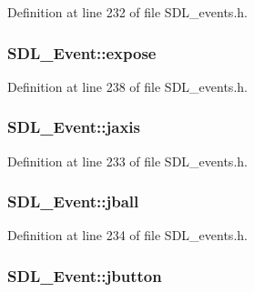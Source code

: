 Definition at line 232 of file S\+D\+L\+\_\+events.\+h.

\hypertarget{union_s_d_l___event_ae70b3cbeb6e05e3e1322a906c9fbe7d5}{}
\subsubsection[{expose}]{ S\+D\+L\+\_\+\+Event\+::expose}\label{union_s_d_l___event_ae70b3cbeb6e05e3e1322a906c9fbe7d5}


Definition at line 238 of file S\+D\+L\+\_\+events.\+h.

\hypertarget{union_s_d_l___event_ac4611acd0e9c675e67dc20919f0accb4}{}
\subsubsection[{jaxis}]{ S\+D\+L\+\_\+\+Event\+::jaxis}\label{union_s_d_l___event_ac4611acd0e9c675e67dc20919f0accb4}


Definition at line 233 of file S\+D\+L\+\_\+events.\+h.

\hypertarget{union_s_d_l___event_ae433f511e3383d17f8fe02df745ee8f8}{}
\subsubsection[{jball}]{ S\+D\+L\+\_\+\+Event\+::jball}\label{union_s_d_l___event_ae433f511e3383d17f8fe02df745ee8f8}


Definition at line 234 of file S\+D\+L\+\_\+events.\+h.

\hypertarget{union_s_d_l___event_a591104d64903ae1cf70874fb5d3124ff}{}
\subsubsection[{jbutton}]{ S\+D\+L\+\_\+\+Event\+::jbutton}\label{union_s_d_l___event_a591104d64903ae1cf70874fb5d3124ff}


